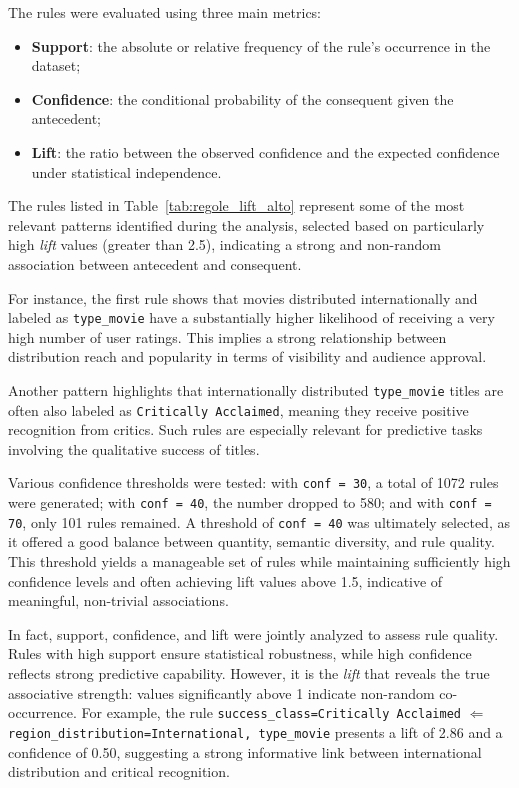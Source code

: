\documentclass{article}
\begin{document}
The rules were evaluated using three main metrics:
\begin{itemize}
  \item \textbf{Support}: the absolute or relative frequency of the rule's occurrence in the dataset;
  \item \textbf{Confidence}: the conditional probability of the consequent given the antecedent;
  \item \textbf{Lift}: the ratio between the observed confidence and the expected confidence under statistical independence.
\end{itemize}

The rules listed in Table~\ref{tab:regole_lift_alto} represent some of the most relevant patterns identified during the analysis, selected based on particularly high \textit{lift} values (greater than 2.5), indicating a strong and non-random association between antecedent and consequent.

For instance, the first rule shows that movies distributed internationally and labeled as \texttt{type\_movie} have a substantially higher likelihood of receiving a very high number of user ratings. This implies a strong relationship between distribution reach and popularity in terms of visibility and audience approval.

Another pattern highlights that internationally distributed \texttt{type\_movie} titles are often also labeled as \texttt{Critically Acclaimed}, meaning they receive positive recognition from critics. Such rules are especially relevant for predictive tasks involving the qualitative success of titles.

Various confidence thresholds were tested: with \texttt{conf = 30}, a total of 1072 rules were generated; with \texttt{conf = 40}, the number dropped to 580; and with \texttt{conf = 70}, only 101 rules remained. A threshold of \texttt{conf = 40} was ultimately selected, as it offered a good balance between quantity, semantic diversity, and rule quality. This threshold yields a manageable set of rules while maintaining sufficiently high confidence levels and often achieving lift values above 1.5, indicative of meaningful, non-trivial associations.

In fact, support, confidence, and lift were jointly analyzed to assess rule quality. Rules with high support ensure statistical robustness, while high confidence reflects strong predictive capability. However, it is the \textit{lift} that reveals the true associative strength: values significantly above 1 indicate non-random co-occurrence. For example, the rule \texttt{success\_class=Critically Acclaimed} $\Leftarrow$ \texttt{region\_distribution=International, type\_movie} presents a lift of 2.86 and a confidence of 0.50, suggesting a strong informative link between international distribution and critical recognition.
\end{document}

